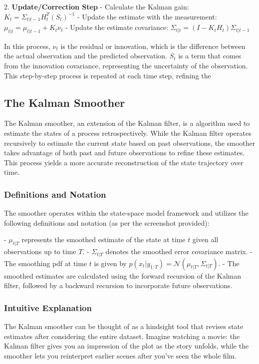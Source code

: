 \documentclass{article}
\begin{document}
2. \textbf{Update/Correction Step}
   - Calculate the Kalman gain: \( K_t = \Sigma_{t|t-1}H_t^T(S_t)^{-1} \)
   - Update the estimate with the measurement: \( \mu_{t|t} = \mu_{t|t-1} + K_t\nu_t \)
   - Update the estimate covariance: \( \Sigma_{t|t} = (I - K_tH_t)\Sigma_{t|t-1} \)

In this process, \( \nu_t \) is the residual or innovation, which is the difference between the actual observation and the predicted observation. \( S_t \) is a term that comes from the innovation covariance, representing the uncertainty of the observation. This step-by-step process is repeated at each time step, refining the 


\subsection{The Kalman Smoother}

The Kalman smoother, an extension of the Kalman filter, is a  algorithm used to estimate the states of a process retrospectively. While the Kalman filter operates recursively to estimate the current state based on past observations, the smoother takes advantage of both past and future observations to refine these estimates. This process yields a more accurate reconstruction of the state trajectory over time.

\subsubsection{Definitions and Notation}
The smoother operates within the state-space model framework and utilizes the following definitions and notation (as per the screenshot provided):

- \(\mu_{t|T}\) represents the smoothed estimate of the state at time \(t\) given all observations up to time \(T\).
- \(\Sigma_{t|T}\) denotes the smoothed error covariance matrix.
- The smoothing pdf at time \(t\) is given by \(p(x_t|y_{1:T}) = \mathcal{N}(\mu_{t|T}, \Sigma_{t|T})\).
- The smoothed estimates are calculated using the forward recursion of the Kalman filter, followed by a backward recursion to incorporate future observations.

\subsubsection{Intuitive Explanation}
The Kalman smoother can be thought of as a hindsight tool that revises state estimates after considering the entire dataset. Imagine watching a movie: the Kalman filter gives you an impression of the plot as the story unfolds, while the smoother lets you reinterpret earlier scenes after you’ve seen the whole film.
\end{document}
